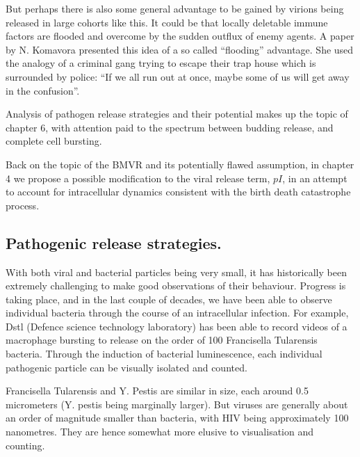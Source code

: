 But perhaps there is also some general advantage to be gained by virions being released in large cohorts like this. It could be that locally deletable immune factors are flooded and overcome by the sudden outflux of enemy agents. A paper by N. Komavora \cite{komarova2007viral} presented this idea of a so called ``flooding'' advantage. She used the analogy of a criminal gang trying to escape their trap house which is surrounded by police: ``If we all run out at once, maybe some of us will get away in the confusion''.\par 

Analysis of pathogen release strategies and their potential makes up the topic of chapter 6, with attention paid to the spectrum between budding release, and complete cell bursting.\par

Back on the topic of the BMVR and its potentially flawed assumption, in chapter 4 we propose a possible modification to the viral release term, $pI$, in an attempt to account for intracellular dynamics consistent with the birth death catastrophe process. 












\subsection{Pathogenic release strategies.} 

With both viral and bacterial particles being very small, it has historically been extremely challenging to make good observations of their behaviour. Progress is taking place, and in the last couple of decades, we have been able to observe individual bacteria through the course of an intracellular infection. For example, Dstl (Defence science technology laboratory) has been able to record videos of a macrophage bursting to release on the order of 100 Francisella Tularensis bacteria. Through the induction of bacterial luminescence, each individual pathogenic particle can be visually isolated and counted.\par
Francisella Tularensis and Y. Pestis are similar in size, each around 0.5 micrometers (Y. pestis being marginally larger). But viruses are generally about an order of magnitude smaller than bacteria, with HIV being approximately 100 nanometres. They are hence somewhat more elusive to visualisation and counting.\par 



